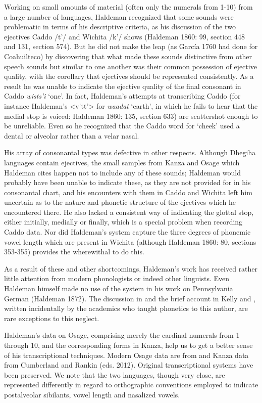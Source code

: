 \documentclass[output=paper]{LSP/langsci}
\begin{document}
Working on small amounts of material (often only the numerals from 1-10) from a large number of languages, Haldeman recognized that some sounds were problematic in terms of his descriptive criteria, as his discussion of the two ejectives  Caddo /t'/ and Wichita /k'/ shows (Haldeman 1860: 99, section 448 and 131, section 574).  But he did not make the leap (as Garc\'ia 1760 had done for Coahuilteco) by discovering that what made these sounds distinctive from other speech sounds but similar to one another was their common possession of ejective quality, with the corollary that ejectives should be represented consistently.  As a result he was unable to indicate the ejective quality of the final consonant in Caddo \textit{wists'i} `one'.  In fact, Haldeman's attempts at transcribing Caddo (for instance Haldeman's <v\'{}tt'> for \textit{waadat} `earth', in which he fails to hear that the medial stop is voiced: Haldeman 1860: 135, section 633) are scattershot enough to be unreliable. Even so he recognized that the Caddo word for `cheek'  used a dental or alveolar rather than a velar nasal.    

His array of consonantal types was defective in other respects. Although Dhegiha languages contain ejectives, the small samples from Kanza and Osage which Haldeman cites happen not to include any of these sounds; Haldeman would probably have been unable to indicate these, as they are not provided for in his consonantal chart, and his encounters with them in Caddo and Wichita left him uncertain as to the nature and phonetic structure of the ejectives which he encountered there.  He also lacked a consistent way of indicating the glottal stop, either initially, medially or finally, which is a special problem when recording Caddo data. Nor did Haldeman's system capture the three degrees of phonemic vowel length which are present in Wichita (although Haldeman 1860: 80, sections 353-355) provides the wherewithal to do this.  

As a result of these and other shortcomings, Haldeman's work has received rather little attention from modern phonologists or indeed other linguists.  Even Haldeman himself made no use of the system in his work on Pennsylvania German (Haldeman 1872).  The discussion in \citet{Pilling1887} and the brief account in Kelly and \citet{Local1989}, written incidentally by the academics who taught phonetics to this author, are  rare exceptions to this neglect.   

Haldeman's data on Osage, comprising merely the cardinal numerals from 1 through 10, and the corresponding forms in Kanza, help us to get a better sense of his transcriptional techniques. Modern Osage data are from \citet{Quintero2009} and Kanza data from Cumberland and Rankin (eds. 2012).  Original transcriptional systems have been preserved. We note that the two languages, though very close, are represented differently in regard to orthographic conventions employed to indicate postalveolar sibilants, vowel length and nasalized vowels. 
\end{document}
